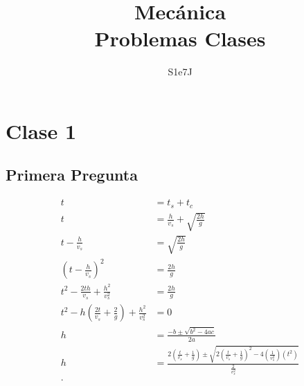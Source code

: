 \documentclass{report}
\title{\Huge{Mecánica}\\Problemas Clases}
\author{\huge{S1e7J}}
\date{}
\begin{document}
\maketitle
\newpage%
\tableofcontents
\pagebreak

\chapter{Clase 1}

\section{Primera Pregunta}
\begin{align*}
  t &= t_s + t_c\\
  t &= \frac{h}{v_s} + \sqrt{\frac{2h}{g}} \\
  t - \frac{h}{v_s} &= \sqrt{\frac{2h}{g}}  \\
  \left( t - \frac{h}{v_s} \right)^2 &= \frac{2h}{g} \\
  t^2 - \frac{2th}{v_s} + \frac{h^2}{v_s^2} &= \frac{2h}{g} \\
  t^2 - h\left( \frac{2t}{v_s} + \frac{2}{g} \right) + \frac{h^2}{v_s^2} &= 0 \\
  h &= \frac{-b \pm \sqrt{b^2 - 4ac} }{2a}\\
  h &= \frac{2\left( \frac{t}{v_s} + \frac{1}{g} \right) \pm \sqrt{2\left( \frac{t}{v_s} + \frac{1}{g} \right)^2 - 4\left( \frac{1}{v_s^2} \right) \left( t^2 \right)  } }{\frac{2}{v_s^2}}  \\
.\end{align*}
\end{document}

